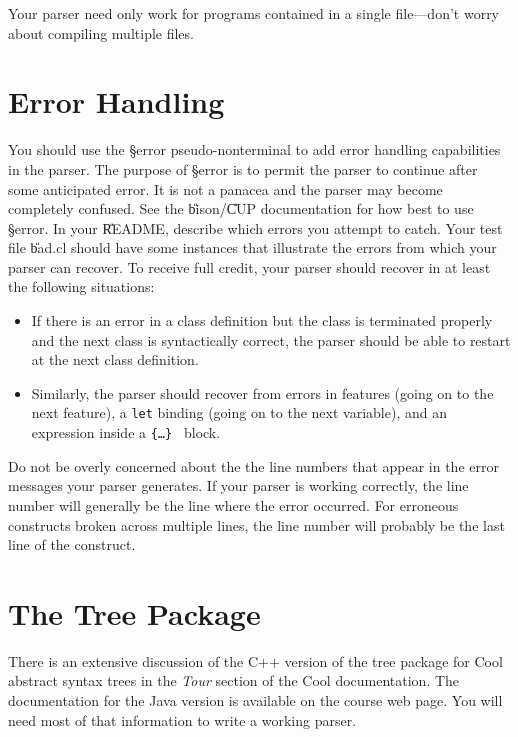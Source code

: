 \documentclass[11pt]{article}
\begin{document}
Your parser need only work for programs contained in a single
file---don't worry about compiling multiple files.

\section{Error Handling}

You should use the \S{error} pseudo-nonterminal to add error handling
capabilities in the parser.  The purpose of \S{error} is to permit the
parser to continue after some anticipated error.  It is not a panacea
and the parser may become completely confused.  See the
\U{bison}/\U{CUP} documentation for how best to use \S{error}.  In
your \U{README}, describe which errors you attempt to catch.  Your
test file \U{bad.cl} should have some instances that illustrate the
errors from which your parser can recover.  To receive full credit,
your parser should recover in at least the following situations:

\begin{itemize}

\item If there is an error in a class definition but the class is
terminated properly and the next class is syntactically correct, the
parser should be able to restart at the next class definition.

\item Similarly, the parser should recover from errors in features
(going on to the next feature), a {\tt let} binding (going on to the
next variable), and an expression inside a {\tt \{\ldots\} } block.

\end{itemize}

Do not be overly concerned about the the line numbers that appear in
the error messages your parser generates.  If your parser is working
correctly, the line number will generally be the line where the error
occurred.  For erroneous constructs broken across multiple lines, the
line number will probably be the last line of the construct.


\section{The Tree Package}
\label{sec-tree}

There is an extensive discussion of the C++ version of the tree
package for Cool abstract syntax trees in the {\em Tour} section of the
Cool documentation.  The documentation for the Java version is available on the
course web page. You will need most of that information to write a
working parser.
\end{document}
